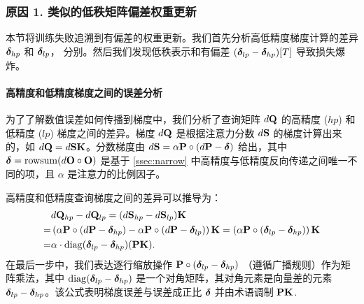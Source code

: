 \documentclass{article} %
\begin{document}
\subsubsection{原因 1. 类似的低秩矩阵偏差权重更新}\label{ssec:cause1}

本节将训练失败追溯到有偏差的权重更新。我们首先分析高低精度梯度计算的差异 ${\boldsymbol{\delta}}_{hp}$ 和 ${\boldsymbol{\delta}}_{lp}$， 分别。然后我们发现低秩表示和有偏差 $({\boldsymbol{\delta}}_{lp} - {\boldsymbol{\delta}}_{hp})[T]$ 导致损失爆炸。

\paragraph{高精度和低精度梯度之间的误差分析}为了了解数值误差如何传播到梯度中，我们分析了查询矩阵 $d{\mathbf{Q}}$ 的高精度 ($hp$) 和低精度 ($lp$) 梯度之间的差异。梯度 $d{\mathbf{Q}}$ 是根据注意力分数 $d{\mathbf{S}}$ 的梯度计算出来的，如 $d{\mathbf{Q}} = d{\mathbf{S}} {\mathbf{K}}$。分数梯度由 $d{\mathbf{S}} = \alpha {\mathbf{P}} \circ (d{\mathbf{P}} - {\boldsymbol{\delta}})$ 给出，其中 ${\boldsymbol{\delta}} = \mathrm{rowsum}(d{\mathbf{O}} \circ {\mathbf{O}})$ 是基于 \cref{ssec:narrow} 中高精度与低精度反向传递之间唯一不同的项，且 $\alpha$ 是注意力的比例因子。

高精度和低精度查询梯度之间的差异可以推导为：
\begin{equation}\label{eq:q_diff}
  \begin{split}
  & d{\mathbf{Q}}_{hp} - d{\mathbf{Q}}_{lp} = (d{\mathbf{S}}_{hp} - d{\mathbf{S}}_{lp}){\mathbf{K}} \\
  =& \left( \alpha {\mathbf{P}} \circ (d{\mathbf{P}} - {\boldsymbol{\delta}}_{hp}) - \alpha {\mathbf{P}} \circ (d{\mathbf{P}} - {\boldsymbol{\delta}}_{lp}) \right) {\mathbf{K}}
  = \left( \alpha {\mathbf{P}} \circ ({\boldsymbol{\delta}}_{lp} - {\boldsymbol{\delta}}_{hp}) \right) {\mathbf{K}} \\
  =& \alpha \cdot \mathrm{diag}({\boldsymbol{\delta}}_{lp} - {\boldsymbol{\delta}}_{hp}) ({\mathbf{P}} {\mathbf{K}}).
  \end{split}
\end{equation}
在最后一步中，我们表达逐行缩放操作 ${\mathbf{P}} \circ ({\boldsymbol{\delta}}_{lp} - {\boldsymbol{\delta}}_{hp})$ （遵循广播规则）作为矩阵乘法，其中 $\mathrm{diag}({\boldsymbol{\delta}}_{lp} - {\boldsymbol{\delta}}_{hp})$  是一个对角矩阵，其对角元素是向量差的元素 ${\boldsymbol{\delta}}_{lp} - {\boldsymbol{\delta}}_{hp}$。该公式表明梯度误差与误差成正比 ${\boldsymbol{\delta}}$ 并由术语调制 ${\mathbf{P}} {\mathbf{K}}$.
\end{document}
